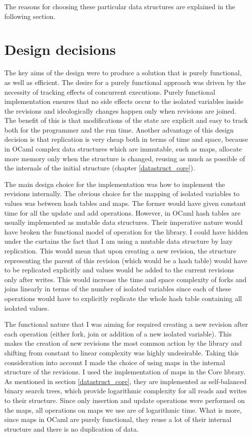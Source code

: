 \documentclass[12pt,twoside,notitlepage]{report}
\begin{document}
{The reasons for choosing these particular data structures are explained in the following section.   

\section{Design decisions}

The key aims of the design were to produce a solution that is purely functional, as well as efficient. The desire for a purely functional approach was driven by the necessity of tracking effects of concurrent executions. Purely functional implementation ensures that no side effects occur to the isolated variables inside the revisions and ideologically changes happen only when revisions are joined. The benefit of this is that modifications of the state are explicit and easy to track both for the programmer and the run time. Another advantage of this design decision is that replication is very cheap both in terms of time and space, because in OCaml complex data structures which are immutable, such as maps, allocate more memory only when the structure is changed, reusing as much as possible of the internals of the initial structure (chapter \ref{datastruct_core}).

The main design choice for the implementation was how to implement the revisions internally. The obvious choice for the mapping of isolated variables to values was between hash tables and maps. The former would have given constant time for all the update and add operations. However, in OCaml hash tables are usually implemented as mutable data structures. Their imperative nature would have broken the functional model of operation for the library. I could have hidden under the curtains the fact that I am using a mutable data structure by lazy replication. This would mean that upon creating a new revision, the structure representing the parent of this revision (which would be a hash table) would have to be replicated explicitly and values would be added to the current revisions only after writes. This would increase the time and space complexity of forks and joins linearly in terms of the number of isolated variables since each of these operations would have to explicitly replicate the whole hash table containing all isolated values. 

The functional nature that I was aiming for required creating a new revision after each operation (either fork, join or addition of a new isolated variable). This makes the creation of new revisions the most common action by the library and shifting from constant to linear complexity was highly undesirable. Taking this consideration into account I made the choice of using maps in the internal structure of the revisions. I used the implementation of maps in the Core library. As mentioned in section \ref{datastruct_core}, they are implemented as self-balanced binary search trees, which provide logarithmic complexity for all reads and writes to their structure. Since only insertion and update operations were performed on the maps, all operations on maps we use are of logarithmic time. What is more, since maps in OCaml are purely functional, they reuse a lot of their internal structure and there is no duplication of data. 

}
\end{document}
